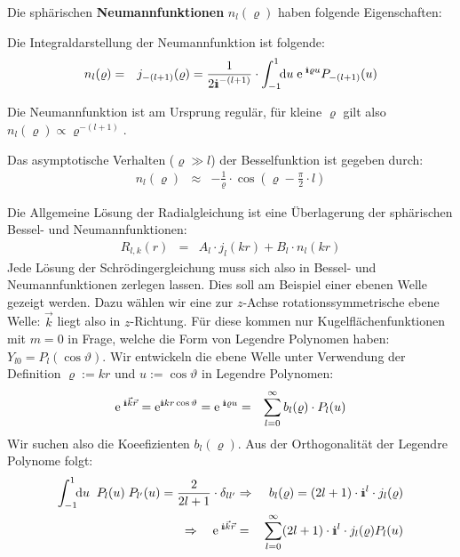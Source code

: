 Die sphärischen {\bf Neumannfunktionen} $n_l(\varrho)$ haben folgende Eigenschaften: 
\begin{itemize1}
	\item Die Integraldarstellung der Neumannfunktion ist folgende: 
	\begin{eqnarray*} 
		n_l(\varrho) &=& j_{-(l+1)}(\varrho) = \frac{1}{2\I^{-(l+1)}} \cdot\int_{-1}^1\!\! \mathrm{d}u\; \e^{\;\I\varrho u} P_{-(l+1)}(u) 
	\end{eqnarray*}
	\item Die Neumannfunktion ist am Ursprung regulär, für kleine $\varrho$ gilt also $n_l(\varrho)\propto \varrho^{-(l+1)}$. 
	\item Das asymptotische Verhalten ($\varrho\gg l$) der Besselfunktion ist gegeben durch: 
	\begin{eqnarray*}
		n_l(\varrho) &\approx& -\frac{1}{\varrho} \cdot \cos\left(\varrho-\frac{\pi}{2} \cdot l \right)
	\end{eqnarray*}
\end{itemize1}

Die Allgemeine Lösung der Radialgleichung ist eine Überlagerung der sphärischen Bessel- und Neumannfunktionen: 
\begin{eqnarray*}
	R_{l,k}(r) &=& A_l\cdot j_l(kr)+B_l\cdot n_l(kr) 
\end{eqnarray*}
Jede Lösung der Schrödingergleichung muss sich also in Bessel- und Neumannfunktionen zerlegen lassen. Dies soll am Beispiel einer ebenen Welle gezeigt werden. Dazu wählen wir eine zur $z$-Achse rotationssymmetrische ebene Welle: $\vec{k}$ liegt also in $z$-Richtung. Für diese kommen nur Kugelflächenfunktionen  mit $m=0$ in Frage, welche die Form von Legendre Polynomen haben: $Y_{l0}=P_l(\cos\vartheta)$. Wir entwickeln die ebene Welle unter Verwendung der Definition $\varrho:=kr$ und $u:=\cos\vartheta$ in Legendre Polynomen: 
\begin{eqnarray*}
	\e^{\;\I \vec{k}\vec{r}} = \e^{\I kr\cos\vartheta}=\e^{\;\I\varrho u} &=& \sum_{l=0}^{\infty} b_l(\varrho)\cdot P_l(u)
\end{eqnarray*}
Wir suchen also die Koeefizienten $b_l(\varrho)$. Aus der Orthogonalität der Legendre Polynome folgt: 
\begin{eqnarray*}
	\int_{-1}^1 \!\!\mathrm{d}u\;\;P_l(u)\;P_{l'}(u)=\frac{2}{2l+1}\cdot\delta_{ll'} &\Rightarrow& b_l(\varrho) = (2l+1)\cdot\I^l \cdot j_l(\varrho)
	\\
	\Rightarrow \quad \e^{\;\I \vec{k}\vec{r}} &=& \sum_{l=0}^{\infty}(2l+1)\cdot\I^l \cdot j_l(\varrho) P_l(u)
\end{eqnarray*}



